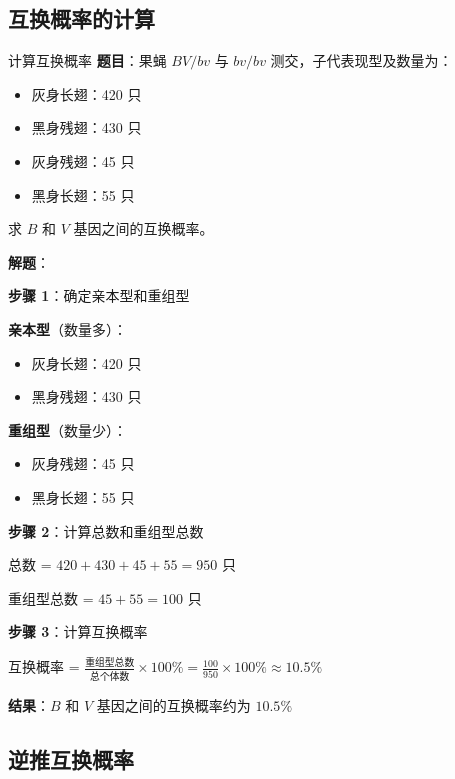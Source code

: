 \documentclass[a4paper,11pt]{ctexart}
\begin{document}
\subsection{互换概率的计算}

\begin{examplebox}{计算互换概率}
\textbf{题目}：果蝇 $BV/bv$ 与 $bv/bv$ 测交，子代表现型及数量为：
\begin{itemize}[leftmargin=2em]
    \item 灰身长翅：420 只
    \item 黑身残翅：430 只
    \item 灰身残翅：45 只
    \item 黑身长翅：55 只
\end{itemize}

求 $B$ 和 $V$ 基因之间的互换概率。

\textbf{解题}：

\textbf{步骤 1}：确定亲本型和重组型

\textbf{亲本型}（数量多）：
\begin{itemize}[leftmargin=2em]
    \item 灰身长翅：420 只
    \item 黑身残翅：430 只
\end{itemize}

\textbf{重组型}（数量少）：
\begin{itemize}[leftmargin=2em]
    \item 灰身残翅：45 只
    \item 黑身长翅：55 只
\end{itemize}

\textbf{步骤 2}：计算总数和重组型总数

总数 = $420 + 430 + 45 + 55 = 950$ 只

重组型总数 = $45 + 55 = 100$ 只

\textbf{步骤 3}：计算互换概率

互换概率 = $\frac{\text{重组型总数}}{\text{总个体数}} \times 100\% = \frac{100}{950} \times 100\% \approx 10.5\%$

\textbf{结果}：$B$ 和 $V$ 基因之间的互换概率约为 $10.5\%$
\end{examplebox}

\subsection{逆推互换概率}
\end{document}

